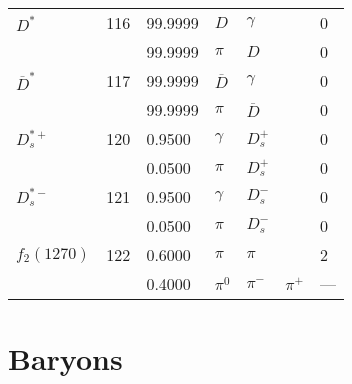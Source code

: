 \documentclass[a4paper,10pt]{article}
\begin{document}
\begin{tabular} {|lr|l|lll|l|}
\hline
$      D^*           $&116& 99.9999&$ D                   $&$ \gamma              $&$                     $& 0\\
$                    $&   & 99.9999&$ \pi                 $&$ D                   $&$                     $& 0\\
\hline
$      \overline{D}^*$&117& 99.9999&$ \overline{D}        $&$ \gamma              $&$                     $& 0\\
$                    $&   & 99.9999&$ \pi                 $&$ \overline{D}        $&$                     $& 0\\
\hline
$      D_s^{*+}      $&120&  0.9500&$ \gamma              $&$ D_s^+               $&$                     $& 0\\
$                    $&   &  0.0500&$ \pi                 $&$ D_s^+               $&$                     $& 0\\
\hline
$      D_s^{*-}      $&121&  0.9500&$ \gamma              $&$ D_s^-               $&$                     $& 0\\
$                    $&   &  0.0500&$ \pi                 $&$ D_s^-               $&$                     $& 0\\
\hline
$      f_2(1270)     $&122&  0.6000&$ \pi                 $&$ \pi                 $&$                     $& 2\\
$                    $&   &  0.4000&$ \pi^0               $&$ \pi^-               $&$ \pi^+               $& ---\\
\hline
\end{tabular}
\section{Baryons}
\end{document}
